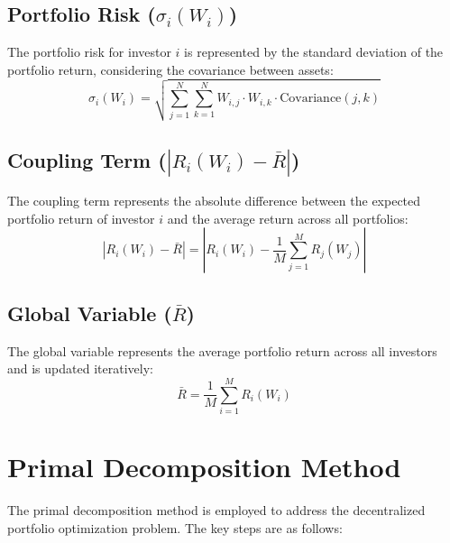 \documentclass{article}
\begin{document}
	\subsection*{Portfolio Risk ($\sigma_i(W_i)$)}
	The portfolio risk for investor $i$ is represented by the standard deviation of the portfolio return, considering the covariance between assets:
	\[ \sigma_i(W_i) = \sqrt{\sum_{j=1}^{N} \sum_{k=1}^{N} W_{i,j} \cdot W_{i,k} \cdot \text{Covariance}(j, k)} \]
	
	\subsection*{Coupling Term ($|R_i(W_i) - \bar{R}|$)}
	The coupling term represents the absolute difference between the expected portfolio return of investor $i$ and the average return across all portfolios:
	\[ |R_i(W_i) - \bar{R}| = \left|R_i(W_i) - \frac{1}{M} \sum_{j=1}^{M} R_j(W_j)\right| \]
	
	\subsection*{Global Variable ($\bar{R}$)}
	The global variable represents the average portfolio return across all investors and is updated iteratively:
	\[ \bar{R} = \frac{1}{M} \sum_{i=1}^{M} R_i(W_i) \]
	
	\section*{Primal Decomposition Method}
	
	The primal decomposition method is employed to address the decentralized portfolio optimization problem. The key steps are as follows:
	
\end{document}

